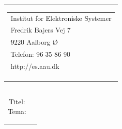 \thispagestyle{empty}
\begin{titlingpage}
 \begin{nopagebreak}
 {\samepage 
 \begin{tabular}{r}
\parbox{\textwidth}{  
 \hfill \parbox{4.7cm}{\begin{tabular}{l}
{\textsf\small  \textsf{Institut for Elektroniske Systemer}} \\		
{\textsf\small Fredrik Bajers Vej 7} \\
{\textsf\small 9220 Aalborg Ø} \\
{\textsf\small Telefon:  96 35 86 90} \\
{\textsf\small http://es.aau.dk}
 \end{tabular}}
}
\\
\end{tabular}
 \begin{tabular}{cc}
\parbox{8cm}{
\begin{description}
 \item[Titel:] 
 \item[Tema:] 
\end{description}

}
\end{tabular}}
\end{nopagebreak}
\end{titlingpage}
